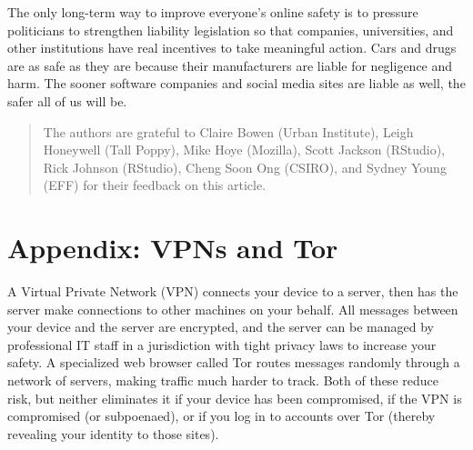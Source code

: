 \documentclass[10pt,letterpaper]{article}
\begin{document}
The only long-term way to improve everyone's online safety is to pressure
politicians to strengthen liability legislation so that companies, universities,
and other institutions have real incentives to take meaningful action. Cars and
drugs are as safe as they are because their manufacturers are liable for
negligence and harm. The sooner software companies and social media sites are
liable as well, the safer all of us will be.

\begin{quote}
  The authors are grateful to Claire Bowen (Urban Institute), Leigh Honeywell
  (Tall Poppy), Mike Hoye (Mozilla), Scott Jackson (RStudio), Rick Johnson
  (RStudio), Cheng Soon Ong (CSIRO), and Sydney Young (EFF) for their feedback
  on this article.
\end{quote}



\section*{Appendix: VPNs and Tor}
  
A Virtual Private Network (VPN) connects your device to a server, then has the
server make connections to other machines on your behalf. All messages between
your device and the server are encrypted, and the server can be managed by
professional IT staff in a jurisdiction with tight privacy laws to increase your
safety. A specialized web browser called Tor routes messages randomly through a
network of servers, making traffic much harder to track. Both of these reduce
risk, but neither eliminates it if your device has been compromised, if the VPN
is compromised (or subpoenaed), or if you log in to accounts over Tor (thereby
revealing your identity to those sites).
\end{document}
